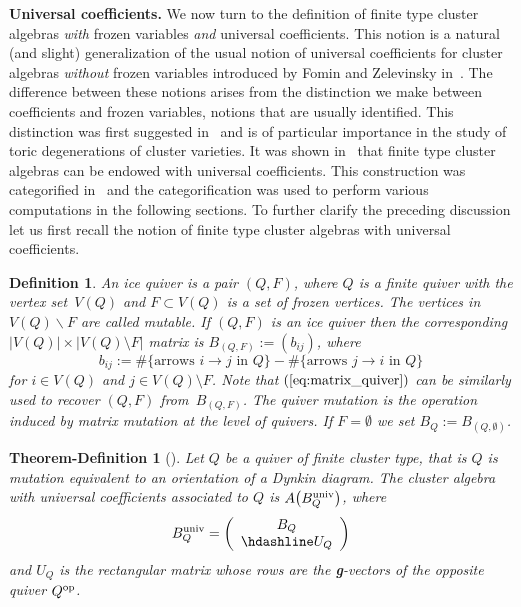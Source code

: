 \documentclass[pdftex]{sigma}%
\newtheorem{Theorem-Definition}[Theorem]{Theorem-Definition}
\newtheorem{Definition}[Theorem]{Definition}
\numberwithin{equation}{section}
\begin{document}
\noindent
{\bf Universal coefficients.} We now turn to the definition of finite type cluster algebras \emph{with} frozen variables \emph{and} universal coefficients.
This notion is a natural (and slight) generalization of the usual notion of universal coefficients for cluster algebras \emph{without} frozen variables introduced by Fomin and Zelevinsky in~\cite[Section~12]{FZ_clustersIV}.
The difference between these notions arises from the distinction we make between coefficients and frozen variables, notions that are usually identified.
This distinction was first suggested in~\cite{BFMN} and is of particular importance in the study of toric degenerations of cluster varieties.
It was shown in~\cite{FZ_clustersIV} that finite type cluster algebras can be endowed with universal coefficients. This construction was categorified in~\cite{NC_univ} and the categorification was used to perform various computations in the following sections.
To further clarify the preceding discussion let us first recall the notion of finite type cluster algebras with universal coefficients.

\begin{Definition}
An {\it ice quiver} is a pair $(Q,F)$, where $Q$ is a finite quiver with the vertex set~$V(Q)$ and $F\subset V(Q)$ is a set of {\it frozen vertices}.
The vertices in $V(Q)\backslash F$ are called {\it mutable}.
If $(Q,F)$ is an ice quiver then the corresponding $|V(Q)|\times |V(Q)\setminus F|$ matrix is $B_{(Q,F)}:=(b_{ij})$, where
\begin{equation}
\label{eq:matrix_quiver}
b_{ij}:= \#\{ \text{arrows } i \to j \text{ in }Q\} - \#\{ \text{arrows } j \to i \text{ in }Q\}
\end{equation}
for $i\in V(Q)$ and $j\in V(Q)\setminus F$. Note that $(\ref{eq:matrix_quiver})$ can be similarly used to recover $(Q,F)$ from~$B_{(Q,F)}$. The {\it quiver mutation} is the operation induced by matrix mutation at the level of quivers.
If $F=\emptyset$ we set $B_{Q}:=B_{(Q,\emptyset)}$.
\end{Definition}
\begin{Theorem-Definition}[{\cite[Corollary 8.15]{Reading}}]
Let $Q$ be a quiver of finite cluster type, that is $Q$ is mutation equivalent to an orientation of a Dynkin diagram.
The {\it cluster algebra with universal coefficients} associated to $Q$ is $A\big(B_Q^{{\rm univ}}\big)$, where
\begin{displaymath}
B^{{\rm univ}}_Q=
\left(
\begin{array}{c}
 B_Q \\ \hdashline
 U_Q
\end{array}
\right)
\end{displaymath}
and $U_Q$ is the rectangular matrix whose rows are the {\bf g}-vectors of the opposite quiver $Q^{\rm op}$.
\end{Theorem-Definition}
\end{document}
